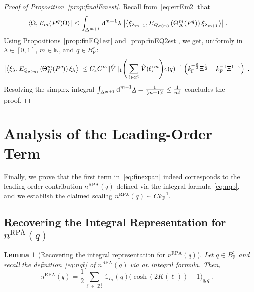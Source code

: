 \documentclass[12pt,a4paper]{article}
\numberwithin{equation}{section}
\newcommand{\1}{\mathbb{I}}
\newcommand{\di}{\textnormal{d}}
\newcommand{\F}{\mathrm{F}}
\newcommand{\RPA}{\mathrm{RPA}}
\DeclareMathOperator{\Z}{\mathbb{Z}}
\newcommand{\half}{\frac{1}{2}}
\newcommand{\eva}[1]{\left\langle #1 \right\rangle}
\theoremstyle{plain}
\newtheorem{lemma}[theorem]{Lemma}
\theoremstyle{definition}
\theoremstyle{remark}
\theoremstyle{plain}
\theoremstyle{definition}
\theoremstyle{remark}
\begin{document}
\begin{proof}[Proof of Proposition~\ref{prop:finalEmest}]
Recall from~\eqref{eq:errEm2} that
\begin{equation}
	\abs{\eva{\Omega, E_m(P^q) \Omega }}
	\le \int_{\Delta^{m+1}} \di^{m+1}\underline{\lambda} \;
		\abs{\eva{\xi_{\lambda_{m+1}}, E_{Q_{\sigma(m)}}\left(\Theta^{m}_{K}(P^q)\right) \xi_{\lambda_{m+1}}}} \;.
\end{equation}		
Using Propositions~\ref{prop:finEQ1est} and~\ref{prop:finEQ2est}, we get, uniformly in $ \lambda \in [0,1] $, $ m \in \mathbb{N} $, and $ q \in B_{\F}^c $:
\begin{equation}
	\abs{\eva{\xi_\lambda, E_{Q_{\sigma(m)}}\left(\Theta^{m}_{K}(P^q)\right) \xi_\lambda}}
	\le C_\varepsilon C^m \Vert \hat{V} \Vert_1
		\Bigg( \sum_{\ell \in \Z^3} \hat{V}(\ell)^m \Bigg)
		e(q)^{-1} \left( k_{\F}^{-\frac{3}{2}} \Xi^\half
		+ k_{\F}^{-1}\Xi^{1-\varepsilon} \right) \;.
\end{equation}
Resolving the simplex integral $ \int_{\Delta^{m+1}} \di^{m+1} \underline{\lambda} = \frac{1}{(m+1)!} \le \frac{1}{m!} $ concludes the proof.
\end{proof}



\section{Analysis of the Leading-Order Term}
\label{sec:leading_order_analysis}


Finally, we prove that the first term in~\eqref{eq:finexpan} indeed corresponds to the leading-order contribution $ n^{\RPA}(q) $ defined via the integral formula~\eqref{eq:nqb}, and we establish the claimed scaling $ n^{\RPA}(q) \sim C k_{\F}^{-1} $.


\subsection{Recovering the Integral Representation for $ n^{\RPA}(q) $}\label{subsec:integralrep}

\begin{lemma}[Recovering the integral representation for $ n^{\RPA}(q) $] \label{lem:nqb_integralrecovery}
Let $q \in B^c_{\F}$ and recall the definition~\eqref{eq:nqb} of $ n^{\RPA}(q) $ via an integral formula. Then,
\begin{equation} \label{eq:nqb_integralrecovery}
	n^{\RPA}(q) = \half\sum_{\ell\in \Z^3_*}\mathds{1}_{L_\ell}(q) \big( \cosh(2K(\ell)) - 1 \big)_{q,q} \;.
\end{equation}
\end{lemma}
\end{document}
